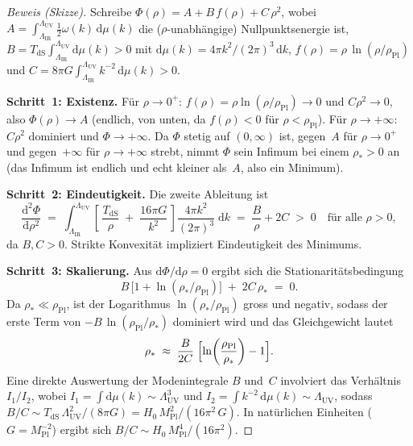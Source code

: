 \documentclass[12pt,a4paper]{article}
\theoremstyle{definition}
\theoremstyle{plain}
\theoremstyle{remark}
\newcommand{\LUV}{\Lambda_{\mathrm{UV}}}
\newcommand{\LIR}{\Lambda_{\mathrm{IR}}}
\newcommand{\dd}{\mathrm{d}}
\begin{document}
\begin{proof}[Beweis (Skizze)]
Schreibe $\Phi(\rho) = A + B\,f(\rho) + C\,\rho^{2}$, wobei
$A = \int_{\LIR}^{\LUV} \tfrac{1}{2}\omega(k)\,\dd\mu(k)$ die
($\rho$-unabh\"angige) Nullpunktsenergie ist,
$B = T_{\mathrm{dS}}\int_{\LIR}^{\LUV}\dd\mu(k) > 0$ mit
$\dd\mu(k) = 4\pi k^{2}/(2\pi)^{3}\,\dd k$,
$f(\rho) = \rho\,\ln(\rho/\rho_{\mathrm{Pl}})$ und
$C = 8\pi G\int_{\LIR}^{\LUV} k^{-2}\,\dd\mu(k) > 0$.

\medskip\noindent
\textbf{Schritt~1: Existenz.}\;
F\"ur $\rho \to 0^{+}$: $f(\rho) = \rho\ln(\rho/\rho_{\mathrm{Pl}}) \to 0$
und $C\rho^{2} \to 0$, also $\Phi(\rho) \to A$ (endlich, von unten, da
$f(\rho) < 0$ f\"ur $\rho < \rho_{\mathrm{Pl}}$).
F\"ur $\rho \to +\infty$: $C\rho^{2}$ dominiert und $\Phi \to +\infty$.
Da $\Phi$ stetig auf $(0,\infty)$ ist, gegen~$A$ f\"ur $\rho \to 0^+$
und gegen~$+\infty$ f\"ur $\rho \to +\infty$ strebt, nimmt $\Phi$ sein
Infimum bei einem $\rho_{\ast} > 0$ an (das Infimum ist endlich und
echt kleiner als~$A$, also ein Minimum).

\medskip\noindent
\textbf{Schritt~2: Eindeutigkeit.}\;
Die zweite Ableitung ist
\begin{equation}
  \frac{\dd^{2}\Phi}{\dd\rho^{2}}
  \;=\; \int_{\LIR}^{\LUV}
  \left[\,
    \frac{T_{\mathrm{dS}}}{\rho}
    \;+\; \frac{16\pi G}{k^{2}}
  \,\right]
  \frac{4\pi k^{2}}{(2\pi)^{3}}\;\dd k
  \;=\; \frac{B}{\rho} + 2C
  \;>\; 0
  \quad\text{f\"ur alle } \rho > 0,
\end{equation}
da $B, C > 0$.  Strikte Konvexit\"at impliziert Eindeutigkeit des Minimums.

\medskip\noindent
\textbf{Schritt~3: Skalierung.}\;
Aus $\dd\Phi/\dd\rho = 0$ ergibt sich die Stationarit\"atsbedingung
\begin{equation}\label{eq:stationarity}
  B\,\bigl[1 + \ln(\rho_{\ast}/\rho_{\mathrm{Pl}})\bigr]
  \;+\; 2C\,\rho_{\ast} \;=\; 0.
\end{equation}
Da $\rho_{\ast} \ll \rho_{\mathrm{Pl}}$, ist der Logarithmus
$\ln(\rho_{\ast}/\rho_{\mathrm{Pl}})$ gross und negativ, sodass der
erste Term von $-B\,\ln(\rho_{\mathrm{Pl}}/\rho_{\ast})$ dominiert wird
und das Gleichgewicht lautet
\begin{equation}\label{eq:balance}
  \rho_{\ast} \;\approx\;
  \frac{B}{2C}\;\Bigl[\ln\!\left(\frac{\rho_{\mathrm{Pl}}}{\rho_{\ast}}\right)
  - 1\Bigr].
\end{equation}
Eine direkte Auswertung der Modenintegrale $B$ und~$C$ involviert das
Verh\"altnis $I_{1}/I_{2}$, wobei $I_{1} = \int \dd\mu(k) \sim \LUV^{3}$
und $I_{2} = \int k^{-2}\,\dd\mu(k) \sim \LUV$, sodass
$B/C \sim T_{\mathrm{dS}}\,\LUV^{2}/(8\pi G)
= H_0\,M_{\mathrm{Pl}}^{2}/(16\pi^{2}\,G)$.
In nat\"urlichen Einheiten ($G = M_{\mathrm{Pl}}^{-2}$) ergibt sich
$B/C \sim H_0\,M_{\mathrm{Pl}}^{4}/(16\pi^{2})$.


\end{proof}
\end{document}

